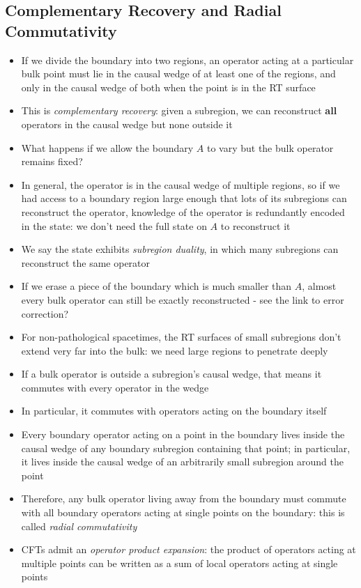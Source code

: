 \documentclass[12pt,a4paper]{article}
\numberwithin{equation}{section}
\begin{document}
	\subsection{Complementary Recovery and Radial Commutativity}
	\begin{itemize}
		\item If we divide the boundary into two regions, an operator acting at a particular bulk point must lie in the causal wedge of at least one of the regions, and only in the causal wedge of both when the point is in the RT surface
		\item This is \textit{complementary recovery}: given a subregion, we can reconstruct \textbf{all} operators in the causal wedge but none outside it
		\item What happens if we allow the boundary $A$ to vary but the bulk operator remains fixed?
		\item In general, the operator is in the causal wedge of multiple regions, so if we had access to a boundary region large enough that lots of its subregions can reconstruct the operator, knowledge of the operator is redundantly encoded in the state: we don't need the full state on $A$ to reconstruct it
		\item We say the state exhibits \textit{subregion duality}, in which many subregions can reconstruct the same operator
		\item If we erase a piece of the boundary which is much smaller than $A$, almost every bulk operator can still be exactly reconstructed - see the link to error correction?
		\item For non-pathological spacetimes, the RT surfaces of small subregions don't extend very far into the bulk: we need large regions to penetrate deeply
		\item If a bulk operator is outside a subregion's causal wedge, that means it commutes with every operator in the wedge
		\item In particular, it commutes with operators acting on the boundary itself
		\item Every boundary operator acting on a point in the boundary lives inside the causal wedge of any boundary subregion containing that point; in particular, it lives inside the causal wedge of an arbitrarily small subregion around the point
		\item Therefore, any bulk operator living away from the boundary must commute with all boundary operators acting at single points on the boundary: this is called \textit{radial commutativity}
		\item CFTs admit an \textit{operator product expansion}: the product of operators acting at multiple points can be written as a sum of local operators acting at single points

\end{itemize}
\end{document}
